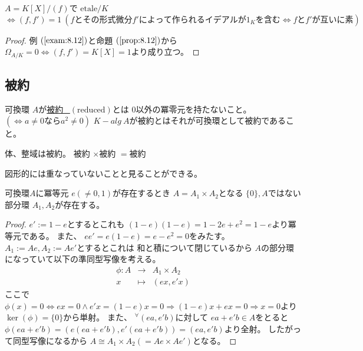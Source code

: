 \documentclass[../master_galois_theory]{subfiles}
\begin{document}
\begin{corl}
  $A = K[X]/(f)$で $\mathrm{etale}/K$ $\Leftrightarrow (f,f') = 1 \  (fとその形式微分 f'によって作られるイデアルが 1_Kを含む \Leftrightarrow fとf'が互いに素)$
\end{corl}

\begin{proof}
  例 $(\mathrm{\ref{exam:8.12}})$と命題 $(\mathrm{\ref{prop:8.12}})$から
  $\Omega_{A/K} = 0 \Leftrightarrow  (f,f') = K[X] = 1$より成り立つ。
\end{proof}

\subsection{被約}

\begin{defi}
  可換環 $A$が\underline{被約 \  $(\mathrm{reduced})$}とは
  $0$以外の冪零元を持たないこと。 $(\Leftrightarrow a \neq 0 なら a^2 \neq 0)$
  $K-alg \  A$が被約とはそれが可換環として被約であること。
\end{defi}

\begin{exam}
  体、整域は被約。
  被約 $\times$被約 $=$被約

  図形的には重なっていないことと見ることができる。
\end{exam}

\begin{lemm} \label{lemm:idempotent}
  可換環$A$に冪等元 $e (\neq 0 , 1)$が存在するとき
  $A = A_1 \times A_2$となる $\{ 0 \} , A$ではない
  部分環 $A_1 , A_2$が存在する。
\end{lemm}

\begin{proof}
  $e' := 1 - e$とするとこれも
  $(1 - e)(1 - e) = 1 - 2e + e^2 = 1 - e$より冪等元である。
  また、 $e e' = e (1 - e) = e - e^2 = 0$をみたす。
  $A_1 := Ae , A_2 := Ae'$とするとこれは 和と積について閉じているから
  $A$の部分環になっていて以下の準同型写像を考える。
  \begin{eqnarray*}
    \phi : A & \longrightarrow & A_1 \times A_2 \\
    x & \longmapsto & (ex , e'x)
  \end{eqnarray*}
  ここで $\phi(x) = 0 \Leftrightarrow ex = 0 \land e'x = (1 - e)x = 0 \Rightarrow (1 - e)x + ex = 0 \Rightarrow x = 0$より $\ker(\phi) = \{ 0 \}$から単射。
  また、 ${}^\forall (ea , e'b)$に対して
  $ea + e'b \in A$をとると
  $\phi(ea + e'b) = (e(ea + e'b) , e'(ea + e'b) ) = (ea , e'b)$より全射。
  したがって同型写像になるから $A \cong A_1 \times A_2 (= Ae \times Ae')$となる。
\end{proof}
\end{document}
